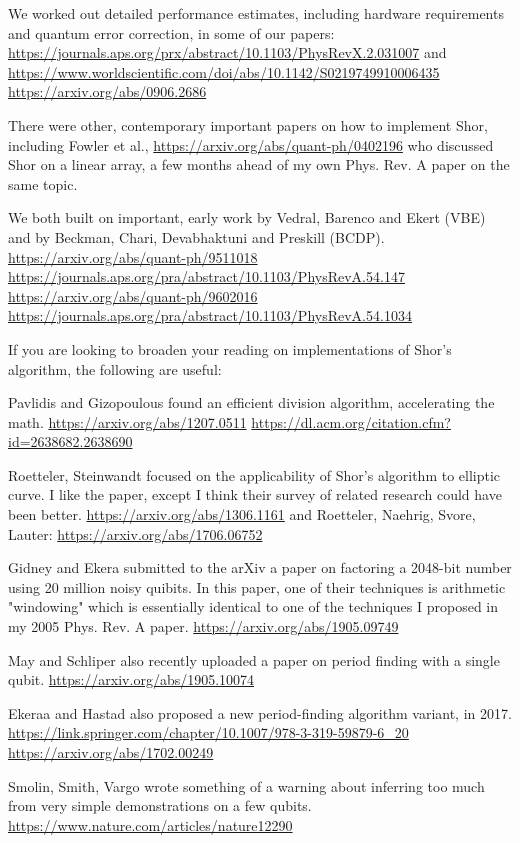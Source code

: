\documentclass[%
 aip,
 jmp,%
 amsmath,amssymb,
 reprint,%
]{revtex4-1}
\begin{document}
We worked out detailed performance estimates, including hardware
requirements and quantum error correction, in some of our papers:
\url{https://journals.aps.org/prx/abstract/10.1103/PhysRevX.2.031007}
and
\url{https://www.worldscientific.com/doi/abs/10.1142/S0219749910006435}
\url{https://arxiv.org/abs/0906.2686}

There were other, contemporary important papers on how to implement
Shor, including Fowler et al., \url{https://arxiv.org/abs/quant-ph/0402196}
who discussed Shor on a linear array, a few months ahead of my own
Phys. Rev. A paper on the same topic.

We both built on important, early work by Vedral, Barenco and Ekert
(VBE) and by Beckman, Chari, Devabhaktuni and Preskill (BCDP).
\url{https://arxiv.org/abs/quant-ph/9511018}
\url{https://journals.aps.org/pra/abstract/10.1103/PhysRevA.54.147}
\url{https://arxiv.org/abs/quant-ph/9602016}
\url{https://journals.aps.org/pra/abstract/10.1103/PhysRevA.54.1034}

If you are looking to broaden your reading on implementations of
Shor’s algorithm, the following are useful:

Pavlidis and Gizopoulous found an efficient division algorithm,
accelerating the math.
\url{https://arxiv.org/abs/1207.0511}
\url{https://dl.acm.org/citation.cfm?id=2638682.2638690}

Roetteler, Steinwandt focused on the applicability of Shor's algorithm
to elliptic curve. I like the paper, except I think their survey of
related research could have been better.
\url{https://arxiv.org/abs/1306.1161}
and Roetteler, Naehrig, Svore, Lauter:
\url{https://arxiv.org/abs/1706.06752}

Gidney and Ekera submitted to the arXiv a paper on factoring a
2048-bit number using 20 million noisy quibits.  In this paper, one of
their techniques is arithmetic "windowing" which is essentially
identical to one of the techniques I proposed in my 2005 Phys. Rev. A
paper.  \url{https://arxiv.org/abs/1905.09749}

May and Schliper also recently uploaded a paper on period finding with
a single qubit.
\url{https://arxiv.org/abs/1905.10074}

Ekeraa and Hastad also proposed a new period-finding algorithm
variant, in 2017.
\url{https://link.springer.com/chapter/10.1007/978-3-319-59879-6_20}
\url{https://arxiv.org/abs/1702.00249}

Smolin, Smith, Vargo wrote something of a warning about inferring too
much from very simple demonstrations on a few qubits.
\url{https://www.nature.com/articles/nature12290}
\end{document}
